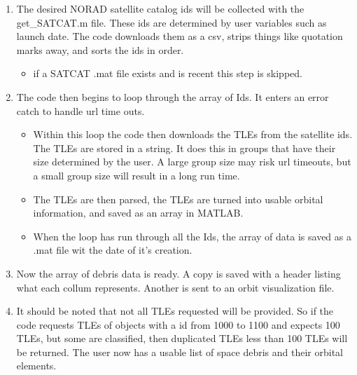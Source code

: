 \documentclass[12pt]{article}
\begin{document}
	\begin{enumerate}
		\item The desired NORAD satellite catalog ids will be collected with the get\_SATCAT.m file. These ids are determined by user variables such as launch date. The code downloads them as a csv, strips things like quotation marks away, and sorts the ids in order.
		\begin{itemize}
			\item if a SATCAT .mat file exists and is recent this step is skipped.
		\end{itemize}  
	\item The code then begins to loop through the array of Ids. It enters an error catch to handle url time outs. 
		\begin{itemize}
		\item Within this loop the code then downloads the TLEs from the satellite ids. The TLEs are stored in a string. It does this in groups that have their size determined by the user. A large group size may risk url timeouts, but a small group size will result in a long run time.
		\item The TLEs are then parsed, the TLEs are turned into usable orbital information, and saved as an array in MATLAB.
		\item When the loop has run through all the Ids, the array of data is saved as a .mat file wit the date of it's creation.
	\end{itemize} 
\item Now the array of debris data is ready. A copy is saved with a header listing what each collum represents. Another is sent to an orbit visualization file. 

\item  It should be noted that not all TLEs requested will be provided. So if the code requests TLEs of objects with a id from 1000 to 1100 and expects 100 TLEs, but some are classified, then duplicated TLEs less than 100 TLEs will be returned. The user now has a usable list of space debris and their orbital elements.
	
	\end{enumerate}
\end{document}
